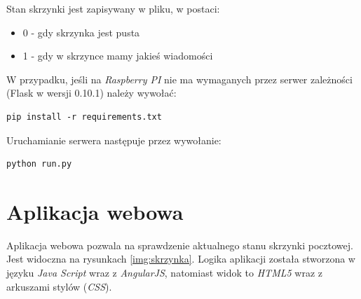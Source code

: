 Stan skrzynki jest zapisywany w pliku, w postaci:
\begin{itemize}
\item 0 - gdy skrzynka jest pusta
\item 1 - gdy w skrzynce mamy jakieś wiadomości
\end{itemize}

W przypadku, jeśli na \textit{Raspberry PI} nie ma wymaganych przez serwer zależności (Flask w wersji 0.10.1) należy wywołać:
\begin{lstlisting}
pip install -r requirements.txt
\end{lstlisting}

Uruchamianie serwera następuje przez wywołanie:
\begin{lstlisting}
python run.py
\end{lstlisting}


\section{Aplikacja webowa}

\begin{center}
	\label{img:skrzynka}
\end{center}

Aplikacja webowa pozwala na sprawdzenie aktualnego stanu skrzynki pocztowej. Jest widoczna na rysunkach \ref{img:skrzynka}.
Logika aplikacji została stworzona w języku \textit{Java Script} wraz z \textit{AngularJS}, natomiast widok to \textit{HTML5} wraz z arkuszami stylów (\textit{CSS}).\\

